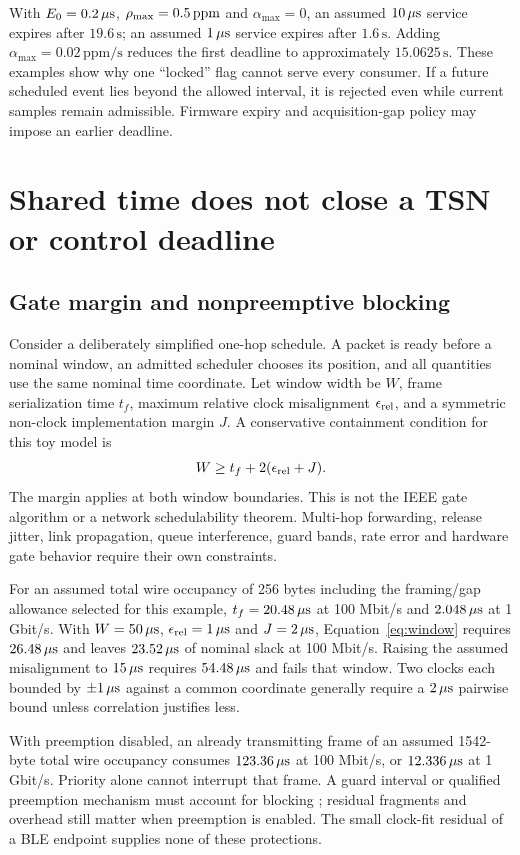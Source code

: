 \documentclass[11pt,letterpaper]{article}
\begin{document}
With $E_0=0.2\,\mu\mathrm{s}$, $\rho_{\max}=0.5\,\mathrm{ppm}$ and $\alpha_{\max}=0$, an assumed $10\,\mu\mathrm{s}$ service expires after $19.6\,\mathrm{s}$; an assumed $1\,\mu\mathrm{s}$ service expires after $1.6\,\mathrm{s}$. Adding $\alpha_{\max}=0.02\,\mathrm{ppm/s}$ reduces the first deadline to approximately $15.0625\,\mathrm{s}$. These examples show why one ``locked'' flag cannot serve every consumer. If a future scheduled event lies beyond the allowed interval, it is rejected even while current samples remain admissible. Firmware expiry and acquisition-gap policy may impose an earlier deadline.

\section{Shared time does not close a TSN or control deadline}
\subsection{Gate margin and nonpreemptive blocking}
Consider a deliberately simplified one-hop schedule. A packet is ready before a nominal window, an admitted scheduler chooses its position, and all quantities use the same nominal time coordinate. Let window width be $W$, frame serialization time $t_f$, maximum relative clock misalignment $\epsilon_{\rm rel}$, and a symmetric non-clock implementation margin $J$. A conservative containment condition for this toy model is
\begin{equation}
 W\geq t_f+2(\epsilon_{\rm rel}+J).
 \label{eq:window}
\end{equation}
The margin applies at both window boundaries. This is not the IEEE gate algorithm or a network schedulability theorem. Multi-hop forwarding, release jitter, link propagation, queue interference, guard bands, rate error and hardware gate behavior require their own constraints.

For an assumed total wire occupancy of 256 bytes including the framing/gap allowance selected for this example, $t_f=20.48\,\mu\mathrm{s}$ at 100 Mbit/s and $2.048\,\mu\mathrm{s}$ at 1 Gbit/s. With $W=50\,\mu\mathrm{s}$, $\epsilon_{\rm rel}=1\,\mu\mathrm{s}$ and $J=2\,\mu\mathrm{s}$, Equation~\ref{eq:window} requires $26.48\,\mu\mathrm{s}$ and leaves $23.52\,\mu\mathrm{s}$ of nominal slack at 100 Mbit/s. Raising the assumed misalignment to $15\,\mu\mathrm{s}$ requires $54.48\,\mu\mathrm{s}$ and fails that window. Two clocks each bounded by $\pm1\,\mu\mathrm{s}$ against a common coordinate generally require a $2\,\mu\mathrm{s}$ pairwise bound unless correlation justifies less.

With preemption disabled, an already transmitting frame of an assumed 1542-byte total wire occupancy consumes $123.36\,\mu\mathrm{s}$ at 100 Mbit/s, or $12.336\,\mu\mathrm{s}$ at 1 Gbit/s. Priority alone cannot interrupt that frame. A guard interval or qualified preemption mechanism must account for blocking \cite{qbu}; residual fragments and overhead still matter when preemption is enabled. The small clock-fit residual of a BLE endpoint supplies none of these protections.
\end{document}
